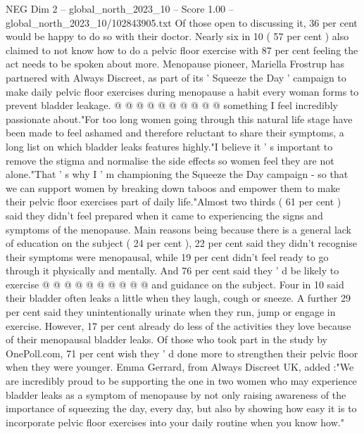 \begin{textsample}{NEG Dim 2 – global\_north\_2023\_10 – Score 1.00 – global\_north\_2023\_10/102843905.txt}
Of those open to discussing it, 36 per cent would be happy to do so with their doctor.
Nearly six in 10 ( 57 per cent ) also claimed to not know how to do a pelvic floor exercise with 87 per cent feeling the act needs to be spoken about more.
Menopause pioneer, Mariella Frostrup has partnered with Always Discreet, as part of its ' Squeeze the Day ' campaign to make daily pelvic floor exercises during menopause a habit every woman forms to prevent bladder leakage. @ @ @ @ @ @ @ @ @ @ something I feel incredibly passionate about."For too long women going through this natural life stage have been made to feel ashamed and therefore reluctant to share their symptoms, a long list on which bladder leaks features highly."I believe it ' s important to remove the stigma and normalise the side effects so women feel they are not alone."That ' s why I ' m championing the Squeeze the Day campaign - so that we can support women by breaking down taboos and empower them to make their pelvic floor exercises part of daily life."Almost two thirds ( 61 per cent ) said they didn't feel prepared when it came to experiencing the signs and symptoms of the menopause.
Main reasons being because there is a general lack of education on the subject ( 24 per cent ), 22 per cent said they didn't recognise their symptoms were menopausal, while 19 per cent didn't feel ready to go through it physically and mentally.
And 76 per cent said they ' d be likely to exercise @ @ @ @ @ @ @ @ @ @ and guidance on the subject.
Four in 10 said their bladder often leaks a little when they laugh, cough or sneeze.
A further 29 per cent said they unintentionally urinate when they run, jump or engage in exercise.
However, 17 per cent already do less of the activities they love because of their menopausal bladder leaks.
Of those who took part in the study by OnePoll.com, 71 per cent wish they ' d done more to strengthen their pelvic floor when they were younger.
Emma Gerrard, from Always Discreet UK, added :"We are incredibly proud to be supporting the one in two women who may experience bladder leaks as a symptom of menopause by not only raising awareness of the importance of squeezing the day, every day, but also by showing how easy it is to incorporate pelvic floor exercises into your daily routine when you know how."

\end{textsample}

